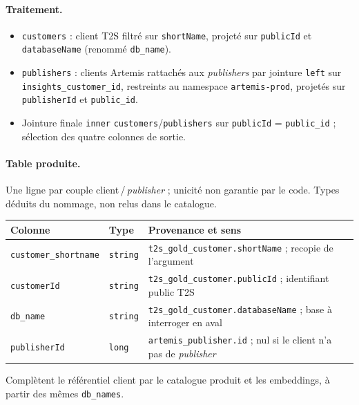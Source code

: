 \documentclass[11pt,a4paper]{article}
\newcommand{\code}[1]{\texttt{\small #1}}
\begin{document}
\paragraph{Traitement.}
\begin{itemize}[nosep,leftmargin=*]
  \item \code{customers} : client T2S filtré sur \code{shortName}, projeté sur
        \code{publicId} et \code{databaseName} (renommé \code{db\_name}).
  \item \code{publishers} : clients Artemis rattachés aux \emph{publishers} par
        jointure \code{left} sur \code{insights\_customer\_id}, restreints au
        namespace \code{artemis-prod}, projetés sur \code{publisherId} et
        \code{public\_id}.
  \item Jointure finale \code{inner} \code{customers}/\code{publishers} sur
        \code{publicId} = \code{public\_id} ; sélection des quatre colonnes de
        sortie.
\end{itemize}

\paragraph{Table produite.}
Une ligne par couple client\,/\,\emph{publisher} ; unicité non garantie par le code.
Types déduits du nommage, non relus dans le catalogue.

\begin{center}
\small
\begin{tabular}{@{}llp{6.8cm}@{}}
\toprule
\textbf{Colonne} & \textbf{Type} & \textbf{Provenance et sens} \\
\midrule
\code{customer\_shortname} & \code{string} & \code{t2s\_gold\_customer.shortName} ; recopie de l'argument \\
\code{customerId}          & \code{string} & \code{t2s\_gold\_customer.publicId} ; identifiant public T2S \\
\code{db\_name}            & \code{string} & \code{t2s\_gold\_customer.databaseName} ; base à interroger en aval \\
\code{publisherId}         & \code{long}   & \code{artemis\_publisher.id} ; nul si le client n'a pas de \emph{publisher} \\
\bottomrule
\end{tabular}
\end{center}

Complètent le référentiel client par le catalogue produit et les embeddings, à partir
des mêmes \code{db\_names}.
\end{document}
